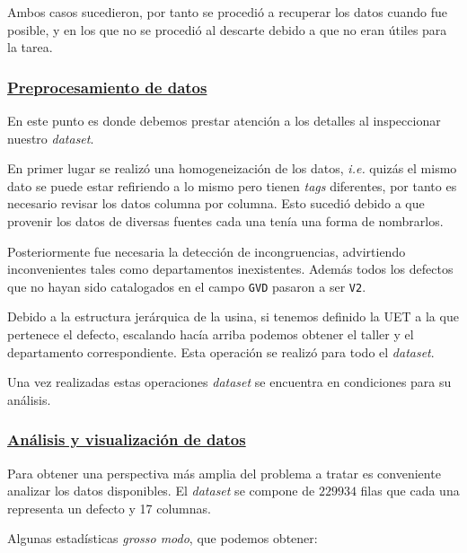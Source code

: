 \documentclass[a4paper,12pt]{article}
\begin{document}
		Ambos casos sucedieron, por tanto se procedió a recuperar los datos cuando fue posible, y en los que no se procedió al descarte debido a que no eran útiles para la tarea.
				
		\subsubsection{\href{https://github.com/GeraCollante/tesis-icomp-machinelearning/blob/main/DataPreproccesing.ipynb}{\color{blue}Preprocesamiento de datos}} \label{DataPreprocessing}
		En este punto es donde debemos prestar atención a los detalles al inspeccionar nuestro \textit{dataset}.
				
		En primer lugar se realizó una homogeneización de los datos, \textit{i.e.} quizás el mismo dato se puede estar refiriendo a lo mismo pero tienen \textit{tags} diferentes, por tanto es necesario revisar los datos columna por columna. Esto sucedió debido a que provenir los datos de diversas fuentes cada una tenía una forma de nombrarlos. 
				
		Posteriormente fue necesaria la detección de incongruencias, advirtiendo inconvenientes tales como departamentos inexistentes. Además todos los defectos que no hayan sido catalogados en el campo \texttt{GVD} pasaron a ser \texttt{V2}.
				
		Debido a la estructura jerárquica de la usina, si tenemos definido la UET a la que pertenece el defecto, escalando hacía arriba podemos obtener el taller y el departamento correspondiente. Esta operación se realizó para todo el \textit{dataset}.
				
		Una vez realizadas estas operaciones \textit{dataset} se encuentra en condiciones para su análisis.
				
		\subsubsection{\href{https://github.com/GeraCollante/tesis-icomp-machinelearning/blob/main/DataPlottingAndAnalysis.ipynb}{\color{blue}Análisis y visualización de datos}}\label{AnalysisVisualization}
		Para obtener una perspectiva más amplia del problema a tratar es conveniente analizar los datos disponibles. El \textit{dataset} se compone de $229934$ filas que cada una representa un defecto y 17 columnas.
				
			\clearpage				
				
		Algunas estadísticas \textit{grosso modo}, que podemos obtener:
				
\end{document}
